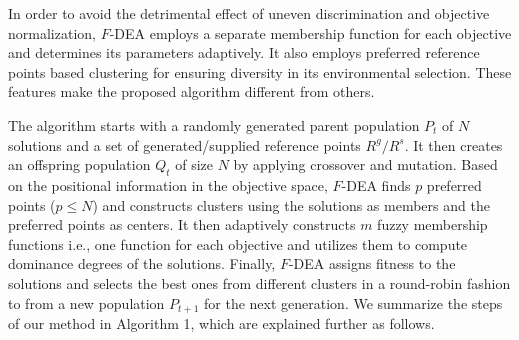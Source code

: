 \documentclass[review]{elsarticle}
\begin{document}

In order to avoid the detrimental effect of uneven discrimination and objective normalization, $F$-DEA employs a separate membership function for each objective and determines its parameters adaptively. 
It also employs preferred reference points based clustering for ensuring diversity in its environmental selection.  
These features make the proposed algorithm different from others.



The algorithm  starts with a randomly generated parent population $P_t$ of $N$ solutions and a set of generated/supplied reference points $R^g/R^s$. It then creates an offspring population $Q_t$ of size $N$ by applying crossover and mutation. 
Based on the positional information in the objective space, $F$-DEA finds $p$ preferred points ($p\le N$) and constructs clusters using the solutions as members  and the preferred points as centers.
It then adaptively constructs $m$ fuzzy membership functions i.e., one function for each objective 
and utilizes them to compute dominance degrees of the solutions. Finally, $F$-DEA assigns fitness to the solutions and selects the best ones from different clusters in a round-robin fashion to from a new population $P_{t+1}$ for the next generation.  
We summarize the steps of our method in Algorithm 1, which are explained further as follows.
\end{document}
